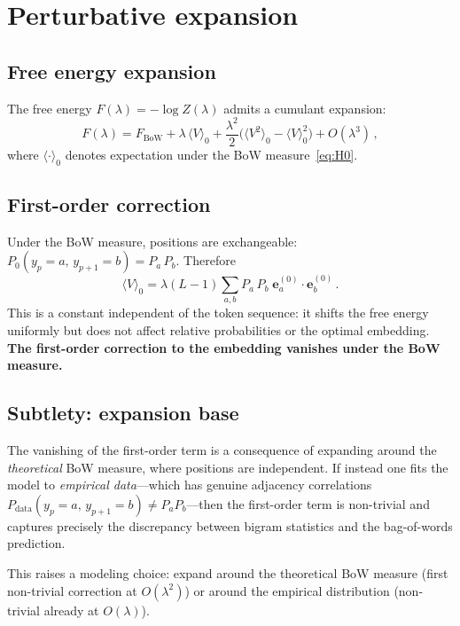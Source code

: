 \documentclass[11pt]{article}
\newcommand{\ee}{\bm{e}}
\newcommand{\BoW}{\mathrm{BoW}}
\begin{document}
\section{Perturbative expansion}\label{sec:perturbative}

\subsection{Free energy expansion}

The free energy $F(\lambda) = -\log Z(\lambda)$ admits a cumulant expansion:
\begin{equation}\label{eq:free-energy}
    F(\lambda) = F_{\BoW} + \lambda\, \langle V \rangle_0 + \frac{\lambda^2}{2}\Big(\langle V^2 \rangle_0 - \langle V \rangle_0^2\Big) + O(\lambda^3)\,,
\end{equation}
where $\langle \cdot \rangle_0$ denotes expectation under the BoW measure~\eqref{eq:H0}.

\subsection{First-order correction}

Under the BoW measure, positions are exchangeable: $P_0(y_p {=} a,\, y_{p+1} {=} b) = P_a\, P_b$. Therefore
\begin{equation}\label{eq:first-order}
    \langle V \rangle_0 = \lambda(L-1) \sum_{a,b} P_a\, P_b\; \ee_a^{(0)} \cdot \ee_b^{(0)}\,.
\end{equation}
This is a constant independent of the token sequence: it shifts the free energy uniformly but does not affect relative probabilities or the optimal embedding. \textbf{The first-order correction to the embedding vanishes under the BoW measure.}

\subsection{Subtlety: expansion base}

The vanishing of the first-order term is a consequence of expanding around the \emph{theoretical} BoW measure, where positions are independent. If instead one fits the model to \emph{empirical data}---which has genuine adjacency correlations $P_{\text{data}}(y_p {=} a,\, y_{p+1} {=} b) \neq P_a P_b$---then the first-order term is non-trivial and captures precisely the discrepancy between bigram statistics and the bag-of-words prediction.

This raises a modeling choice: expand around the theoretical BoW measure (first non-trivial correction at $O(\lambda^2)$) or around the empirical distribution (non-trivial already at $O(\lambda)$).
\end{document}
